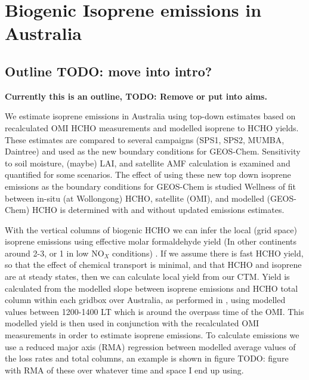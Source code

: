 
%
%



\chapter{Biogenic Isoprene emissions in Australia} %
\label{BioIsop}


\section{Outline TODO: move into intro?}
  \textbf{Currently this is an outline, TODO: Remove or put into aims.}
  
  We estimate isoprene emissions in Australia using top-down estimates based on recalculated OMI HCHO measurements and modelled isoprene to HCHO yields.
  These estimates are compared to several campaigns (SPS1, SPS2, MUMBA, Daintree) and used as the new boundary conditions for GEOS-Chem.
  Sensitivity to soil moisture, (maybe) LAI, and satellite AMF calculation is examined and quantified for some scenarios.
  The effect of using these new top down isoprene emissions as the boundary conditions for GEOS-Chem is studied
  Wellness of fit between in-situ (at Wollongong) HCHO, satellite (OMI), and modelled (GEOS-Chem) HCHO is determined with and without updated emissions estimates.
  
  With the vertical columns of biogenic HCHO we can infer the local (grid space) isoprene emissions using effective molar formaldehyde yield (In other continents around 2-3, or 1 in low NO$_X$ conditions) \citep{Palmer2003,Marais2012,Bauwens2016}.
  If we assume there is fast HCHO yield, so that the effect of chemical transport is minimal, and that HCHO and isoprene are at steady states, then we can calculate local yield from our CTM.
  Yield is calculated from the modelled slope between isoprene emissions and HCHO total column within each gridbox over Australia, as performed in \cite{Palmer2003}, using modelled values between 1200-1400 LT which is around the overpass time of the OMI.
  This modelled yield is then used in conjunction with the recalculated OMI measurements in order to estimate isoprene emissions.
  To calculate emissions we use a reduced major axis (RMA) regression between modelled average values of the loss rates and total columns, an example is shown in figure TODO: figure with RMA of these over whatever time and space I end up using.
  
